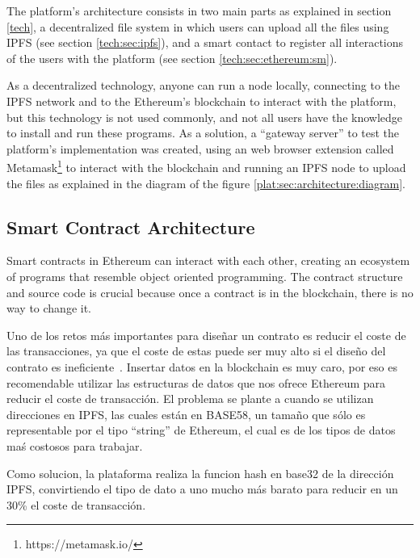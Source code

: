 The platform's architecture consists in two main parts as explained in section
\ref{tech}, a decentralized file system in which users can upload all the files
using IPFS (see section \ref{tech:sec:ipfs}), and a smart contact to register
all interactions of the users with the platform (see section
\ref{tech:sec:ethereum:sm}).

As a decentralized technology, anyone can run a node locally, connecting to the
IPFS network and to the Ethereum's blockchain to interact with the platform, but
this technology is not used commonly, and not all users have the knowledge to
install and run these programs. As a solution, a ``gateway server'' to test the
platform's implementation was created, using an web browser extension called
Metamask\footnote[1]{https://metamask.io/} to interact with the blockchain and
running an IPFS node to upload the files as explained in the diagram of the
figure \ref{plat:sec:architecture:diagram}.


\subsection{Smart Contract Architecture}

Smart contracts in Ethereum can interact with each other, creating an ecosystem
of programs that resemble object oriented programming. The contract structure
and source code is crucial because once a contract is in the blockchain, there
is no way to change it.

Uno de los retos más importantes para diseñar un contrato es reducir el coste de
las transacciones, ya que el coste de estas puede ser muy alto si el diseño del
contrato es ineficiente~\cite{croman2016scaling}. Insertar datos en la
blockchain es muy caro, por eso es recomendable utilizar las estructuras de
datos que nos ofrece Ethereum para reducir el coste de transacción. El problema
se plante a cuando se utilizan direcciones en IPFS, las cuales están en BASE58,
un tamaño que sólo es representable por el tipo ``string'' de Ethereum, el cual
es de los tipos de datos maś costosos para trabajar.

Como solucion, la plataforma realiza la funcion hash en base32 de la dirección
IPFS, convirtiendo el tipo de dato a uno mucho más barato para reducir en un
30\% el coste de transacción.


